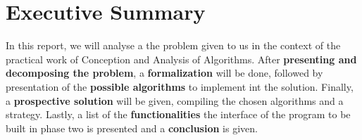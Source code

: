 \chapter{Executive Summary}
In this report, we will analyse a the problem given to us in the context of the practical work of Conception and Analysis of Algorithms. After \textbf{presenting and decomposing the problem}, a \textbf{formalization} will be done, followed by presentation of the \textbf{possible algorithms} to implement int the solution. Finally, a \textbf{prospective solution} will be given, compiling the chosen algorithms and a strategy. Lastly, a list of the \textbf{functionalities} the interface of the program to be built in phase two is presented and a \textbf{conclusion} is given.